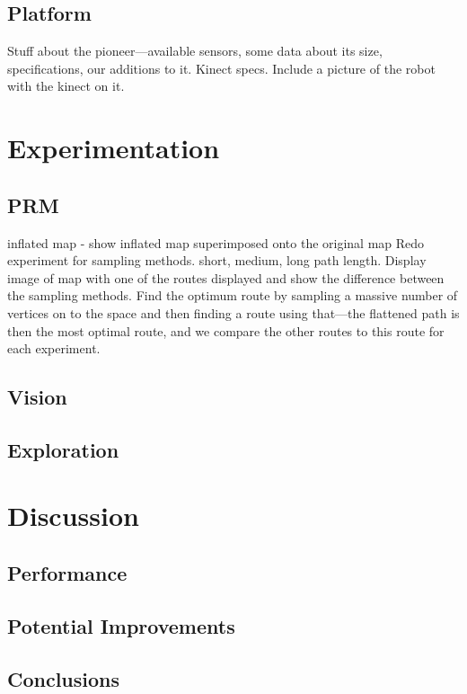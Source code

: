 \documentclass[conference]{IEEEtran}
\begin{document}
\subsection{Platform}
Stuff about the pioneer---available sensors, some data about its size, specifications, our additions to it. Kinect specs. Include a picture of the robot with the kinect on it. 
\section{Experimentation}
\subsection{PRM}
inflated map - show inflated map superimposed onto the original map
Redo experiment for sampling methods. short, medium, long path length. Display image of map with one of the routes displayed and show the difference between the sampling methods. Find the optimum route by sampling a massive number of vertices on to the space and then finding a route using that---the flattened path is then the most optimal route, and we compare the other routes to this route for each experiment.
\subsection{Vision}
\subsection{Exploration}
\section{Discussion}
\subsection{Performance}
\subsection{Potential Improvements}
\subsection{Conclusions}


\end{document}
